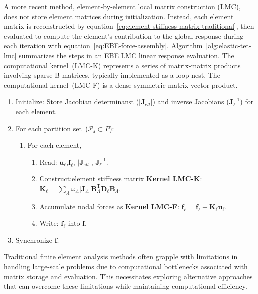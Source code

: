 \documentclass[]             %
{NASA}                       %
\begin{document}
A more recent method, element-by-element local matrix construction (LMC), does not store element matrices during initialization. Instead, each element matrix is reconstructed by equation~\ref{eq:element-stiffness-matrix-traditional}, then evaluated to compute the element's 
contribution to the global response during each iteration with equation~\ref{eq:EBE-force-assembly}. 
Algorithm~\ref{alg:elastic-tet-lmc} summarizes the steps in an EBE LMC linear response evaluation.
 The computational kernel~(LMC\nobreakdash-K) represents a series of matrix-matrix products involving sparse %
 B\nobreakdash-matrices, typically implemented as a loop nest.
 The computational kernel~(LMC\nobreakdash-F) is a dense symmetric matrix-vector product.
\begin{algorithm}[ht]%
\caption{Linear response EBE LMC physics evaluation}
\label{alg:elastic-tet-lmc}
\begin{enumerate}
\item Initialize: Store Jacobian determinanst ($|\mathbf{J}_{ell}|$) and inverse Jacobians ($\mathbf{J}_{\ell}^{-1}$) for each element. 
\item For each partition set~($\mathcal{P_{s}} \subset P$):
\begin{enumerate}
\item For each element,
\begin{enumerate}
\item Read: $\mathbf{u}_{\ell}$,$\mathbf{f}_{\ell}$, $|\mathbf{J}_{ell}|$, $\mathbf{J}_{\ell}^{-1}$.
\item Construct:element stiffness matrix
\newline
\textbf{Kernel LMC\nobreakdash-K}: $\mathbf{K}_{\ell}=\sum_{\Lambda}\omega_{\Lambda}|\mathbf{J}_{\Lambda}|\mathbf{B}_{\Lambda}^\mathrm{T}\mathbf{D}_{\ell}\mathbf{B}_{\Lambda}$.
\item Accumulate nodal forces as
\newline
\textbf{Kernel LMC\nobreakdash-F}: $\mathbf{f}_{\ell}=\mathbf{f}_{\ell}+\mathbf{K}_{\ell}\mathbf{u}_{\ell}$.
\item Write: $\mathbf{f}_{\ell}$ into $\mathbf{f}$.
\end{enumerate}
\end{enumerate}
\item Synchronize $\mathbf{f}$.
\end{enumerate}
\end{algorithm}

%
Traditional finite element analysis methods often grapple with limitations in handling large-scale problems due to computational bottlenecks associated with matrix storage and evaluation. This necessitates exploring alternative approaches that can overcome these limitations while maintaining computational efficiency.
\end{document}
